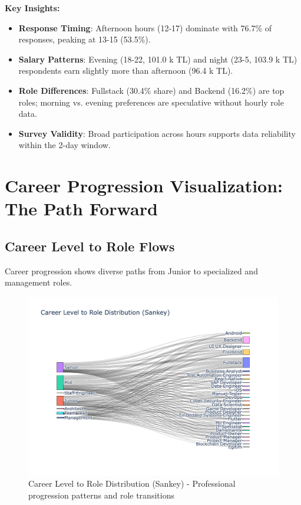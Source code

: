 \documentclass[12pt,a4paper]{article}
\begin{document}
\textbf{Key Insights:}
\begin{itemize}
	\item \textbf{Response Timing}: Afternoon hours (12-17) dominate with 76.7\% of responses, peaking at 13-15 (53.5\%).
	\item \textbf{Salary Patterns}: Evening (18-22, 101.0 k TL) and night (23-5, 103.9 k TL) respondents earn slightly more than afternoon (96.4 k TL).
	\item \textbf{Role Differences}: Fullstack (30.4\% share) and Backend (16.2\%) are top roles; morning vs. evening preferences are speculative without hourly role data.
    \item \textbf{Survey Validity}: Broad participation across hours supports data reliability within the 2-day window.
\end{itemize}

\section{Career Progression Visualization: The Path Forward}

\subsection{Career Level to Role Flows}
Career progression shows diverse paths from Junior to specialized and management roles.

\begin{figure}[H]
    \centering
    \includegraphics[width=\textwidth]{figures/sankey_career_level_role.png}
    \caption{Career Level to Role Distribution (Sankey) - Professional progression patterns and role transitions}
\end{figure}
\end{document}
